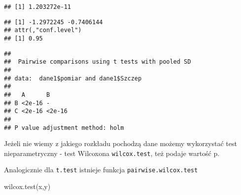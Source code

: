 \documentclass[
]{book}
\newenvironment{Shaded}{\begin{snugshade}}{\end{snugshade}}
\newcommand{\CommentTok}[1]{\textcolor[rgb]{0.56,0.35,0.01}{\textit{#1}}}
\newcommand{\FunctionTok}[1]{\textcolor[rgb]{0.00,0.00,0.00}{#1}}
\newcommand{\NormalTok}[1]{#1}
\newcommand{\OtherTok}[1]{\textcolor[rgb]{0.56,0.35,0.01}{#1}}
\newcommand{\SpecialCharTok}[1]{\textcolor[rgb]{0.00,0.00,0.00}{#1}}
\begin{document}
\begin{Shaded}
\end{Shaded}

\begin{verbatim}
## [1] 1.203272e-11
\end{verbatim}

\begin{Shaded}
\end{Shaded}

\begin{verbatim}
## [1] -1.2972245 -0.7406144
## attr(,"conf.level")
## [1] 0.95
\end{verbatim}

\begin{Shaded}
\end{Shaded}

\begin{verbatim}
## 
##  Pairwise comparisons using t tests with pooled SD 
## 
## data:  dane1$pomiar and dane1$Szczep 
## 
##   A      B     
## B <2e-16 -     
## C <2e-16 <2e-16
## 
## P value adjustment method: holm
\end{verbatim}

Jeżeli nie wiemy z jakiego rozkładu pochodzą dane możemy wykorzystać test nieparametryczny - test Wilcoxona \texttt{wilcox.test}, też podaje wartość p.

Analogicznie dla \texttt{t.test} istnieje funkcja \texttt{pairwise.wilcox.test}

\begin{Shaded}
\begin{Highlighting}[]
\FunctionTok{wilcox.test}\NormalTok{(x,y)}
\end{Highlighting}
\end{Shaded}
\end{document}
